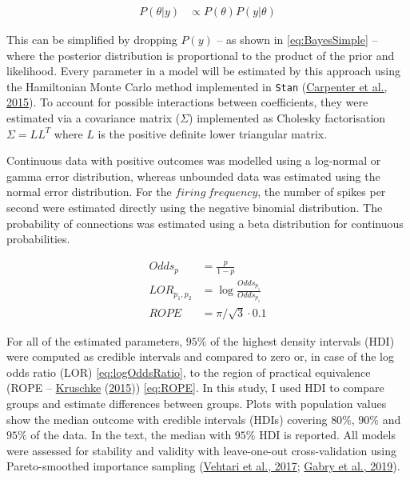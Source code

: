 \documentclass[
  12pt,
  a4paper,
  openany]{book}
\begin{document}
\begin{align}
P(\theta|y) &\propto P(\theta)P(y|\theta)
\label{eq:BayesSimple}
\end{align}

\noindent
This can be simplified by dropping \(P(y)\) -- as shown in \eqref{eq:BayesSimple} -- where the posterior distribution is proportional to the product of the prior and likelihood. Every parameter in a model will be estimated by this approach using the Hamiltonian Monte Carlo method implemented in \texttt{Stan} (\protect\hyperlink{ref-carpenter_stan_2015}{Carpenter et al., 2015}). To account for possible interactions between coefficients, they were estimated via a covariance matrix (\(\Sigma\)) implemented as Cholesky factorisation \(\Sigma=LL^{T}\) where \(L\) is the positive definite lower triangular matrix.

Continuous data with positive outcomes was modelled using a log-normal or gamma error distribution, whereas unbounded data was estimated using the normal error distribution. For the \(firing\ frequency\), the number of spikes per second were estimated directly using the negative binomial distribution. The probability of connections was estimated using a beta distribution for continuous probabilities.

\begin{align}
Odds_{p} &= \frac{p}{1-p} \label{eq:Odds} \\
LOR_{p_{1},p_{2}} &= \log \frac{Odds_{p_{1}}}{Odds_{p_{1}}} \label{eq:logOddsRatio} \\
ROPE &= \pi/\sqrt{3} \cdot 0.1 \label{eq:ROPE}
\end{align}

\noindent
For all of the estimated parameters, \(95\%\) of the highest density intervals (HDI) were computed as credible intervals and compared to zero or, in case of the log odds ratio (LOR) \eqref{eq:logOddsRatio}, to the region of practical equivalence (ROPE -- \protect\hyperlink{ref-kruschke_doing_2015}{Kruschke} (\protect\hyperlink{ref-kruschke_doing_2015}{2015})) \eqref{eq:ROPE}. In this study, I used HDI to compare groups and estimate differences between groups. Plots with population values show the median outcome with credible intervals (HDIs) covering \(80\%\), \(90\%\) and \(95\%\) of the data. In the text, the median with \(95\%\) HDI is reported. All models were assessed for stability and validity with leave-one-out cross-validation using Pareto-smoothed importance sampling (\protect\hyperlink{ref-vehtari_practical_2017}{Vehtari et al., 2017}; \protect\hyperlink{ref-gabry_visualization_2019}{Gabry et al., 2019}).
\end{document}
